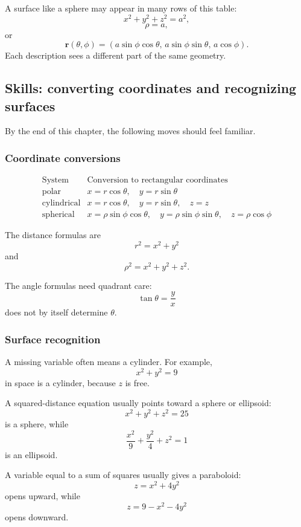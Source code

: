 A surface like a sphere may appear in many rows of this table:
\[
    x^2+y^2+z^2=a^2,
\]
\[
    \rho=a,
\]
or
\[
    \mathbf r(\theta,\phi)
    =
    (a\sin\phi\cos\theta,\,
     a\sin\phi\sin\theta,\,
     a\cos\phi).
\]
Each description sees a different part of the same geometry.

\subsection{Skills: converting coordinates and recognizing surfaces}

By the end of this chapter, the following moves should feel familiar.

\subsubsection*{Coordinate conversions}

\[
\begin{array}{c|c}
\text{System} & \text{Conversion to rectangular coordinates} \\ \hline
\text{polar} &
x=r\cos\theta,\quad y=r\sin\theta\\[1mm]
\text{cylindrical} &
x=r\cos\theta,\quad y=r\sin\theta,\quad z=z\\[1mm]
\text{spherical} &
x=\rho\sin\phi\cos\theta,\quad
y=\rho\sin\phi\sin\theta,\quad
z=\rho\cos\phi
\end{array}
\]

The distance formulas are
\[
    r^2=x^2+y^2
\]
and
\[
    \rho^2=x^2+y^2+z^2.
\]

The angle formulas need quadrant care:
\[
    \tan\theta=\frac{y}{x}
\]
does not by itself determine \(\theta\).

\subsubsection*{Surface recognition}

A missing variable often means a cylinder.  For example,
\[
    x^2+y^2=9
\]
in space is a cylinder, because \(z\) is free.

A squared-distance equation usually points toward a sphere or ellipsoid:
\[
    x^2+y^2+z^2=25
\]
is a sphere, while
\[
    \frac{x^2}{9}+\frac{y^2}{4}+z^2=1
\]
is an ellipsoid.

A variable equal to a sum of squares usually gives a paraboloid:
\[
    z=x^2+4y^2
\]
opens upward, while
\[
    z=9-x^2-4y^2
\]
opens downward.


